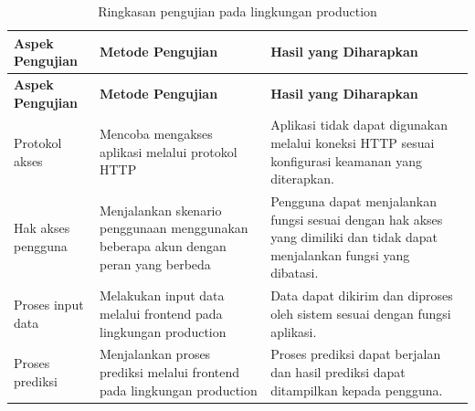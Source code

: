 \begin{longtable}{|p{3.2cm}|p{4.0cm}|p{4.0cm}|}
    \caption{Ringkasan pengujian pada lingkungan production}
    \label{tab:pengujian-production} \\
    \hline
    \textbf{Aspek Pengujian} & \textbf{Metode Pengujian} & \textbf{Hasil yang Diharapkan} \\
    \hline
    \endfirsthead

    \hline
    \textbf{Aspek Pengujian} & \textbf{Metode Pengujian} & \textbf{Hasil yang Diharapkan} \\
    \hline
    \endhead

    Protokol akses &
    Mencoba mengakses aplikasi melalui protokol HTTP &
    Aplikasi tidak dapat digunakan melalui koneksi HTTP sesuai konfigurasi keamanan yang diterapkan. \\
    \hline
    Hak akses pengguna &
    Menjalankan skenario penggunaan menggunakan beberapa akun dengan peran yang berbeda &
    Pengguna dapat menjalankan fungsi sesuai dengan hak akses yang dimiliki dan tidak dapat menjalankan fungsi yang dibatasi. \\
    \hline
    Proses input data &
    Melakukan input data melalui frontend pada lingkungan production &
    Data dapat dikirim dan diproses oleh sistem sesuai dengan fungsi aplikasi. \\
    \hline
    Proses prediksi &
    Menjalankan proses prediksi melalui frontend pada lingkungan production &
    Proses prediksi dapat berjalan dan hasil prediksi dapat ditampilkan kepada pengguna. \\
    \hline
\end{longtable}





